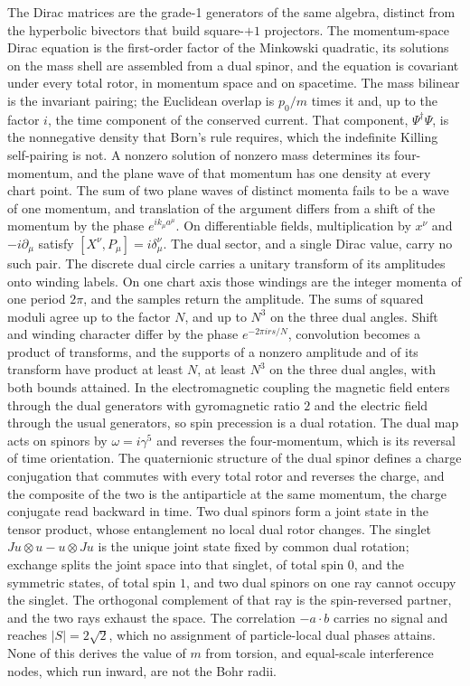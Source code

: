 \documentclass[a4paper]{article}
\begin{document}
The Dirac matrices are the grade-1 generators of the same algebra, distinct from the hyperbolic bivectors that build square-$+1$ projectors. The momentum-space Dirac equation is the first-order factor of the Minkowski quadratic, its solutions on the mass shell are assembled from a dual spinor, and the equation is covariant under every total rotor, in momentum space and on spacetime. The mass bilinear is the invariant pairing; the Euclidean overlap is $p_0/m$ times it and, up to the factor $i$, the time component of the conserved current. That component, $\Psi^\dagger\Psi$, is the nonnegative density that Born's rule requires, which the indefinite Killing self-pairing is not. A nonzero solution of nonzero mass determines its four-momentum, and the plane wave of that momentum has one density at every chart point. The sum of two plane waves of distinct momenta fails to be a wave of one momentum, and translation of the argument differs from a shift of the momentum by the phase $e^{ik_\mu a^\mu}$. On differentiable fields, multiplication by $x^\nu$ and $-i\partial_\mu$ satisfy $[X^\nu,P_\mu]=i\delta^\nu_\mu$. The dual sector, and a single Dirac value, carry no such pair. The discrete dual circle carries a unitary transform of its amplitudes onto winding labels. On one chart axis those windings are the integer momenta of one period \(2\pi\), and the samples return the amplitude. The sums of squared moduli agree up to the factor $N$, and up to $N^3$ on the three dual angles. Shift and winding character differ by the phase $e^{-2\pi i rs/N}$, convolution becomes a product of transforms, and the supports of a nonzero amplitude and of its transform have product at least $N$, at least $N^3$ on the three dual angles, with both bounds attained. In the electromagnetic coupling the magnetic field enters through the dual generators with gyromagnetic ratio $2$ and the electric field through the usual generators, so spin precession is a dual rotation. The dual map acts on spinors by $\omega=i\gamma^5$ and reverses the four-momentum, which is its reversal of time orientation. The quaternionic structure of the dual spinor defines a charge conjugation that commutes with every total rotor and reverses the charge, and the composite of the two is the antiparticle at the same momentum, the charge conjugate read backward in time. Two dual spinors form a joint state in the tensor product, whose entanglement no local dual rotor changes. The singlet $Ju\otimes u-u\otimes Ju$ is the unique joint state fixed by common dual rotation; exchange splits the joint space into that singlet, of total spin $0$, and the symmetric states, of total spin $1$, and two dual spinors on one ray cannot occupy the singlet. The orthogonal complement of that ray is the spin-reversed partner, and the two rays exhaust the space. The correlation $-a\cdot b$ carries no signal and reaches $|S|=2\sqrt2$, which no assignment of particle-local dual phases attains. None of this derives the value of $m$ from torsion, and equal-scale interference nodes, which run inward, are not the Bohr radii.
\end{document}
